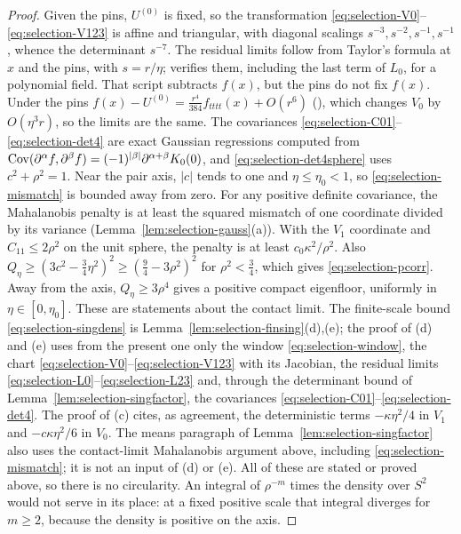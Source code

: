 \begin{proof}
Given the pins, $U^{(0)}$ is fixed, so the transformation \eqref{eq:selection-V0}--\eqref{eq:selection-V123} is affine and triangular, with diagonal scalings $s^{-3},s^{-2},s^{-1},s^{-1}$, whence the determinant $s^{-7}$. The residual limits follow from Taylor's formula at $x$ and the pins, with $s=r/\eta$;  verifies them, including the last term of $L_0$, for a polynomial field. That script subtracts $f(x)$, but the pins do not fix $f(x)$. Under the pins $f(x)-U^{(0)}=\frac{r^4}{384}f_{tttt}(x)+O(r^6)$ (), which changes $V_0$ by $O(\eta^3r)$, so the limits are the same. The covariances \eqref{eq:selection-C01}--\eqref{eq:selection-det4} are exact Gaussian regressions computed from $\operatorname{Cov}(\partial^\alpha f,\partial^\beta f)=(-1)^{|\beta|}\partial^{\alpha+\beta}K_0(0)$, and \eqref{eq:selection-det4sphere} uses $c^2+\rho^2=1$. Near the pair axis, $|c|$ tends to one and $\eta\le\eta_0<1$, so \eqref{eq:selection-mismatch} is bounded away from zero. For any positive definite covariance, the Mahalanobis penalty is at least the squared mismatch of one coordinate divided by its variance (Lemma~\ref{lem:selection-gauss}(a)). With the $V_1$ coordinate and $C_{11}\le2\rho^2$ on the unit sphere, the penalty is at least $c_0\kappa^2/\rho^2$. Also $Q_\eta\ge(3c^2-\frac34\eta^2)^2\ge(\frac94-3\rho^2)^2$ for $\rho^2<\frac34$, which gives \eqref{eq:selection-pcorr}. Away from the axis, $Q_\eta\ge3\rho^4$ gives a positive compact eigenfloor, uniformly in $\eta\in[0,\eta_0]$. These are statements about the contact limit. The finite-scale bound \eqref{eq:selection-singdens} is Lemma~\ref{lem:selection-finsing}(d),(e); the proof of (d) and (e) uses from the present one only the window \eqref{eq:selection-window}, the chart \eqref{eq:selection-V0}--\eqref{eq:selection-V123} with its Jacobian, the residual limits \eqref{eq:selection-L0}--\eqref{eq:selection-L23} and, through the determinant bound of Lemma~\ref{lem:selection-singfactor}, the covariances \eqref{eq:selection-C01}--\eqref{eq:selection-det4}. The proof of (c) cites, as agreement, the deterministic terms $-\kappa\eta^2/4$ in $V_1$ and $-c\kappa\eta^2/6$ in $V_0$. The means paragraph of Lemma~\ref{lem:selection-singfactor} also uses the contact-limit Mahalanobis argument above, including \eqref{eq:selection-mismatch}; it is not an input of (d) or (e). All of these are stated or proved above, so there is no circularity. An integral of $\rho^{-m}$ times the density over $S^2$ would not serve in its place: at a fixed positive scale that integral diverges for $m\ge2$, because the density is positive on the axis.
\end{proof}

